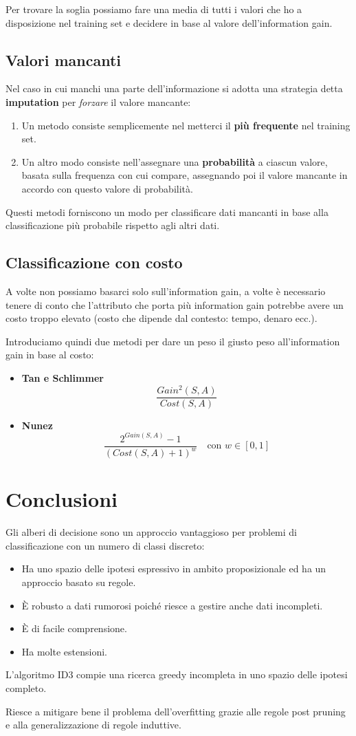 Per trovare la soglia possiamo fare una media di tutti i valori che ho a disposizione nel training set e decidere in
base al valore dell'information gain.

\subsection{Valori mancanti}
Nel caso in cui manchi una parte dell'informazione si adotta una strategia detta \textbf{imputation} per \emph{forzare}
il valore mancante:
\begin{enumerate}
	\item Un metodo consiste semplicemente nel metterci il \textbf{pi\`u frequente} nel training set.
	\item Un altro modo consiste nell'assegnare una \textbf{probabilit\`a} a ciascun valore, basata sulla frequenza con
	      cui compare, assegnando poi il valore mancante in accordo con questo valore di probabilit\`a.
\end{enumerate}
Questi metodi forniscono un modo per classificare dati mancanti in base alla classificazione pi\`u probabile rispetto
agli altri dati.

\subsection{Classificazione con costo}
A volte non possiamo basarci solo sull'information gain, a volte \`e necessario tenere di conto che l'attributo che
porta pi\`u information gain potrebbe avere un costo troppo elevato (costo che dipende dal contesto: tempo, denaro
ecc.).

Introduciamo quindi due metodi per dare un peso il giusto peso all'information gain in base al costo:
\begin{itemize}
	\item \textbf{Tan e Schlimmer}
	      \[ \frac{Gain^2(S, A)}{Cost(S, A)} \]
	\item \textbf{Nunez}
	      \[ \frac{2^{Gain(S, A)} - 1}{(Cost(S, A) + 1)^w} \quad \text{con } w \in [0, 1] \]
\end{itemize}

\section{Conclusioni}
Gli alberi di decisione sono un approccio vantaggioso per problemi di classificazione con un numero di classi discreto:
\begin{itemize}
	\item Ha uno spazio delle ipotesi espressivo in ambito proposizionale ed ha un approccio basato su regole.
	\item \`E robusto a dati rumorosi poich\'e riesce a gestire anche dati incompleti.
	\item \`E di facile comprensione.
	\item Ha molte estensioni.
\end{itemize}
L'algoritmo ID3 compie una ricerca greedy incompleta in uno spazio delle ipotesi completo.

Riesce a mitigare bene il problema dell'overfitting grazie alle regole post pruning e alla generalizzazione di regole
induttive.